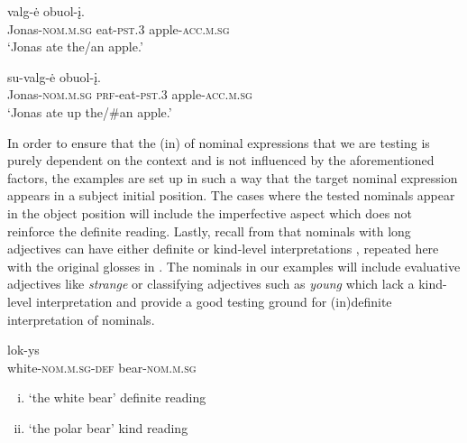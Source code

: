 \documentclass[output=paper,
modfonts
]{langscibook}
\begin{document}
\begin{exe}
\ex \label{ex:sereikaite:30}
\begin{xlist}
	\ex \label{ex:sereikaite:30a}
	 {valg-ė} {obuol-į}.\\
	Jonas-\textsc{nom.m.sg} eat-\textsc{pst.3} apple-\textsc{acc.m.sg}\\
	\trans `Jonas ate the/an apple.' \citep[75]{GillonArmoskaite2015}
	
	\ex \label{ex:sereikaite:30b}
	 {su-valg-ė} {obuol-į}.\\
	Jonas-\textsc{nom.m.sg} \textsc{prf}-eat-\textsc{pst.3} apple-\textsc{acc.m.sg}\\
	\trans `Jonas ate up the/\#an apple.' \citep[76]{GillonArmoskaite2015}
\end{xlist}
\end{exe}

In order to ensure that the (in) of nominal expressions that we are testing is purely dependent on the context and is not influenced by the aforementioned factors, the examples are set up in such a way that the target nominal expression appears in a subject initial position. The cases where the tested nominals appear in the object position will include the imperfective aspect which does not reinforce the definite reading.
Lastly, recall from  that nominals with long adjectives can have either definite or kind-level interpretations , repeated here with the original glosses in . The nominals in our examples will include evaluative adjectives like \textit{strange} or classifying adjectives such as \textit{young} which lack a kind-level interpretation and provide a good testing ground for (in)definite interpretation of nominals.


\begin{exe} 
\ex \label{ex:sereikaite:31}
 {lok-ys} \\
white-\textsc{nom.m.sg}-{\textsc{def}} bear-\textsc{nom.m.sg}  \\
\trans 
\begin{enumerate}[(i)]
	\item `the white bear' \checkmark definite reading  
	\item `the polar bear' \checkmark kind reading  
\end{enumerate}
\end{exe}
\end{document}
